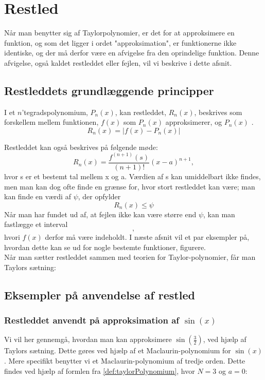 \chapter{Restled}

Når man benytter sig af Taylorpolynomier, er det for at approksimere en funktion, og som det ligger i ordet "approksimation", er funktionerne ikke identiske, og der må derfor være en afvigelse fra den oprindelige funktion. Denne afvigelse, også kaldet restleddet eller fejlen, vil vi beskrive i dette afsnit.

\section{Restleddets grundlæggende principper}
\begin{defn}
	I et $n$'tegradspolynomium, $P_n(x)$, kan restleddet, $R_n(x)$, beskrives som 			forskellem mellem funktionen, $f(x)$ som $P_n(x)$ approksimerer, og 		$P_n(x)$ \citep{calc_et}.\
	\begin{equation*}
		R_n(x)=|f(x)-P_n(x)|
	\end{equation*}
\end{defn}
Restleddet kan også beskrives på følgende møde:
\begin{equation}
	R_n(x)=\frac{f^{(n+1)}(s)}{(n+1)!}(x-a)^{n+1},
\end{equation}
hvor s er et bestemt tal mellem x og a. %
Værdien af s kan umiddelbart ikke findes, men man kan dog ofte finde en grænse for, hvor stort restleddet kan være; man kan finde en værdi af $\psi$, der opfylder
\begin{equation}
\label{eq: rest}
	R_n(x)\leq \psi
\end{equation}
Når man har fundet ud af, at fejlen ikke kan være større end $\psi$, kan man fastlægge et interval 
\begin{equation*}
[P_n(x)-\psi,P_n(x)+\psi],
\end{equation*}
hvori $f(x)$ derfor må være indeholdt. I næste afsnit vil et par eksempler på, hvordan dette kan se ud for nogle bestemte funktioner, figurere.\\
Når man sætter restleddet sammen med teorien for Taylor-polynomier, får man Taylors sætning:


\section{Eksempler på anvendelse af restled}
\subsection*{Restleddet anvendt på approksimation af $\sin(x)$}
Vi vil her gennemgå, hvordan man kan approksimere $\sin(\frac{3}{2})$, ved hjælp af Taylors sætning. Dette gøres ved hjælp af et Maclaurin-polynomium for $\sin(x)$. Mere specifikt benytter vi et Maclaurin-polynomium af tredje orden.
Dette findes ved hjælp af formlen fra \ref{def:taylorPolynomium}, hvor $N=3$ og $a=0$:


